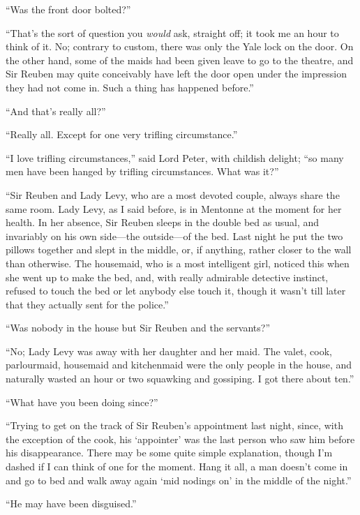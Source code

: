 \enquote{Was the front door bolted?}

\enquote{That’s the sort of question you \textit{would} ask, straight off; it took me an hour to think of it. No; contrary to custom, there was only the Yale lock on the door. On the other hand, some of the maids had been given leave to go to the theatre, and Sir Reuben may quite conceivably have left the door open under the impression they had not come in. Such a thing has happened before.}

\enquote{And that’s really all?}

\enquote{Really all. Except for one very trifling circumstance.}

\enquote{I love trifling circumstances,} said Lord Peter, with childish delight; \enquote{so many men have been hanged by trifling circumstances. What was it?}

\enquote{Sir Reuben and Lady Levy, who are a most devoted couple, always share the same room. Lady Levy, as I said before, is in Mentonne at the moment for her health. In her absence, Sir Reuben sleeps in the double bed as usual, and invariably on his own side\allowbreak---\allowbreak the outside\allowbreak---\allowbreak of the bed. Last night he put the two pillows together and slept in the middle, or, if anything, rather closer to the wall than otherwise. The housemaid, who is a most intelligent girl, noticed this when she went up to make the bed, and, with really admirable detective instinct, refused to touch the bed or let anybody else touch it, though it wasn’t till later that they actually sent for the police.}

\enquote{Was nobody in the house but Sir Reuben and the servants?}

\enquote{No; Lady Levy was away with her daughter and her maid. The valet, cook, parlourmaid, housemaid and kitchenmaid were the only people in the house, and naturally wasted an hour or two squawking and gossiping. I got there about ten.}

\enquote{What have you been doing since?}

\enquote{Trying to get on the track of Sir Reuben’s appointment last night, since, with the exception of the cook, his \enquote{appointer} was the last person who saw him before his disappearance. There may be some quite simple explanation, though I’m dashed if I can think of one for the moment. Hang it all, a man doesn’t come in and go to bed and walk away again \enquote{mid nodings on} in the middle of the night.}

\enquote{He may have been disguised.}

